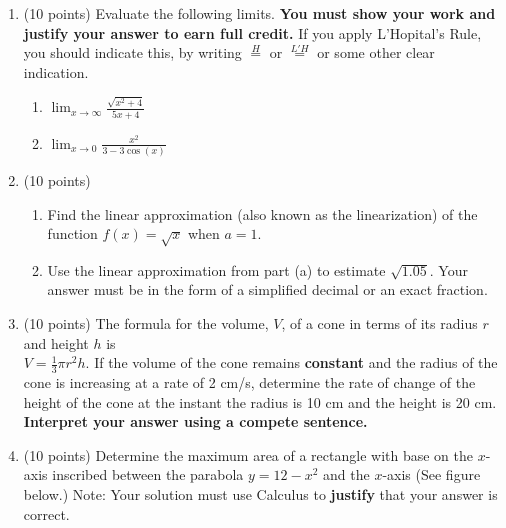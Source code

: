 \documentclass[12pt]{article}
\renewcommand{\emph}[1]{\textsf{\textbf{#1}}}
\begin{document}
\newpage
\begin{enumerate}

\item (10 points) Evaluate the following limits. \textbf{You must show your work and justify your answer to earn full credit.} If you apply L'Hopital's Rule, you should indicate this, by writing $\overset{H}{=}$ or $\overset{L'H}{=}$ or some other clear indication.
	\begin{enumerate}
	\item $\displaystyle{\lim_{x \to \infty} \frac{\sqrt{x^2+4}}{5x+4}}$ 
	\vfill
	\item $\displaystyle{\lim_{x\to 0} \frac{x^2}{3-3\cos(x)}}$
	\vfill
	\end{enumerate}
	
\item (10 points)%
	\begin{enumerate}
	\item Find the linear approximation (also known as the linearization) of the function $f(x)=\sqrt{x}$ when $a=1.$
	\vfill
	\item Use the linear approximation from part (a) to estimate $\sqrt{1.05}$. Your answer must be in the form of a simplified decimal or an exact fraction.
	\vfill
	\end{enumerate}
\newpage

\item (10 points) The formula for the volume, $V$, of a cone in terms of its radius $r$ and height $h$ is \\$V=\frac{1}{3} \pi r^2 h.$ 
If the volume of the cone remains {\bf constant} and the radius of the cone is increasing at a rate of 2 cm/s, determine the rate of change of the height of the cone at the instant the radius is 10 cm and the height is 20 cm. \textbf{Interpret your answer using a compete sentence.} 
\newpage


\item (10 points) Determine the maximum area of a rectangle with base on the $x$-axis inscribed between the parabola $y=12-x^2$ and the $x$-axis (See figure below.) 
Note: Your solution must use Calculus to \emph{justify} that your answer is correct.\\


\end{enumerate}
\end{document}
